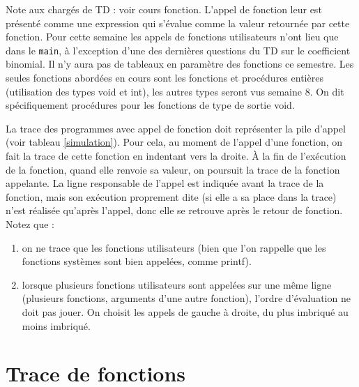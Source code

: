 
\newcommand{\commentaire}[1]{}


\vspace{-1,8cm}

\begin{correction}
  Note aux chargés de TD : voir cours fonction. L'appel de fonction
  leur est présenté comme une expression qui s'évalue comme la valeur
  retournée par cette fonction.  Pour cette semaine les appels de
  fonctions utilisateurs n'ont lieu que dans le \verb+main+, à
  l'exception d'une des dernières questions du TD sur le coefficient
  binomial. Il n'y aura pas de tableaux en paramètre des fonctions ce
  semestre.  Les seules fonctions abordées en cours sont les fonctions
  et procédures entières (utilisation des types void et int), les
  autres types seront vus semaine 8. On dit spécifiquement procédures pour les
  fonctions de type de sortie void.
  
  La trace des programmes avec appel de fonction doit représenter la
  pile d'appel (voir tableau \ref{simulation}). Pour cela, au moment
  de l'appel d'une fonction, on fait la trace de cette fonction en
  indentant vers la droite. À la fin de l'exécution de la fonction,
  quand elle renvoie sa valeur, on poursuit la trace de la fonction
  appelante. La ligne responsable de l'appel est indiquée avant la
  trace de la fonction, mais son exécution proprement dite (si elle a
  sa place dans la trace) n'est réalisée qu'après l'appel, donc elle
  se retrouve après le retour de fonction. Notez que :
\begin{enumerate}
\item on ne trace que les fonctions utilisateurs (bien que l'on
  rappelle que les fonctions systèmes sont bien appelées, comme
  printf).
\item lorsque plusieurs fonctions utilisateurs sont appelées sur une
  même ligne (plusieurs fonctions, arguments d'une autre fonction),
  l'ordre d'évaluation ne doit pas jouer. On choisit les appels de
  gauche à droite, du plus imbriqué au moins imbriqué.
  \end{enumerate}
\end{correction}

\section{Trace de fonctions}

